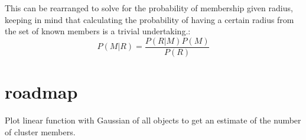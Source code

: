 \documentclass{article}
\begin{document}
\begin{multicols}{2}
This can be rearranged to solve for the probability of membership given radius, keeping in mind that calculating the probability of having a certain radius from the set of known members is a trivial undertaking.:
\begin{equation}
P(M|R)=\frac{P(R|M)P(M)}{P(R)}
\end{equation}

\section{roadmap}
Plot linear function with Gaussian of all objects to get an estimate of the number of cluster members.
\end{multicols}
\end{document}
